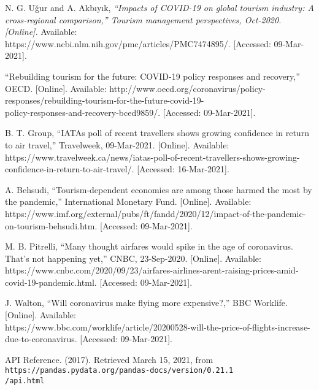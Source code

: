 \documentclass[fontsize=11pt]{article}
\begin{document}
\newpage
\begin{thebibliography}{9}
N. G. Uğur and A. Akbıyık, \textit{“Impacts of COVID-19 on global tourism industry: A cross-regional comparison,” Tourism management perspectives, Oct-2020. [Online].} Available: \\ https://www.ncbi.nlm.nih.gov/pmc/articles/PMC7474895/. [Accessed: 09-Mar-2021].

“Rebuilding tourism for the future: COVID-19 policy responses and recovery,” OECD. [Online]. Available:  http://www.oecd.org/coronavirus/policy-responses/rebuilding-tourism-for-the-future-covid-19-\\policy-responses-and-recovery-bced9859/. [Accessed: 09-Mar-2021].

B. T. Group, “IATAs poll of recent travellers shows growing confidence in return to air travel,” Travelweek, 09-Mar-2021. [Online]. Available: https://www.travelweek.ca/news/iatas-poll-of-recent-travellers-shows-growing-confidence-in-return-to-air-travel/. [Accessed: 16-Mar-2021].

A. Behsudi, “Tourism-dependent economies are among those harmed the most by the pandemic,” International Monetary Fund. [Online]. Available: https://www.imf.org/external/pubs/ft/fandd/2020/12/impact-of-the-pandemic-on-tourism-behsudi.htm. [Accessed: 09-Mar-2021].

M. B. Pitrelli, “Many thought airfares would spike in the age of coronavirus. That's not happening yet,” CNBC, 23-Sep-2020. [Online]. Available: https://www.cnbc.com/2020/09/23/airfares-airlines-arent-raising-prices-amid-covid-19-pandemic.html. [Accessed: 09-Mar-2021].

J. Walton, “Will coronavirus make flying more expensive?,” BBC Worklife. [Online]. Available: \\ https://www.bbc.com/worklife/article/20200528-will-the-price-of-flights-increase-due-to-coronavirus. [Accessed: 09-Mar-2021].

API Reference. (2017). Retrieved March 15, 2021, from 
\texttt{https://pandas.pydata.org/pandas-docs/version/0.21.1\\/api.html}


\end{thebibliography}
\end{document}
